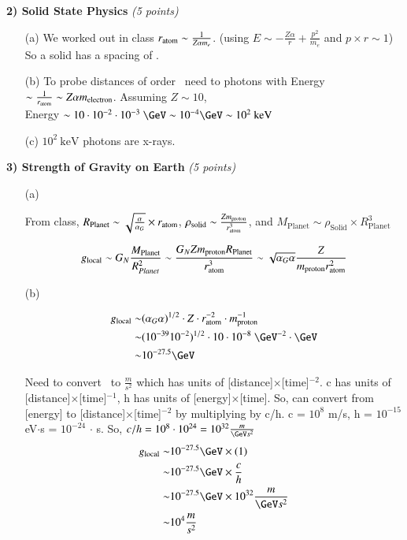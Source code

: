 {\large
\textbf{2) Solid State Physics} \hfill \textit{(5 points)}
\begin{itemize}
\item[(a)] {
We worked out in class $r_{\textrm{atom}} \sim \frac{1}{Z\alpha m_e}$. (using $E\sim - \frac{Z\alpha}{r} + \frac{p^2}{m_e}$ and $p\times r \sim 1$)
So a solid has a spacing of \rAtom.
}
\item[(b)] {
To probe distances of order \rAtom\ need to photons with Energy $\sim \frac{1}{r_{\textrm{atom}}} \sim Z \alpha m_{\textrm{electron}}$.
Assuming $Z\sim 10$, \\Energy $\sim 10 \cdot 10^{-2} \cdot 10^{-3}\ \GeV \sim 10^{-4} \GeV \sim 10^2\ \textrm{keV}$
}
\item[(c)] $10^2\ \textrm{keV}$ photons are x-rays.
\end{itemize}

\vspace*{0.25in}

\textbf{3) Strength of Gravity on Earth} \hfill \textit{(5 points)}
\begin{itemize}
\item[(a)]{
From class, $R_{\textrm{Planet}} \sim  \sqrt{\frac{\alpha}{\alpha_G}} \times r_{\textrm{atom}}$,   $\rho_{\textrm{solid}} \sim \frac{Zm_{\textrm{proton}}}{r_{\textrm{atom}}^3}$, and $M_{\textrm{Planet}} \sim \rho_{\textrm{Solid}} \times R_{\textrm{Planet}}^3$

\begin{equation*}
g_{\textrm{local}} \sim G_N \frac{M_{\textrm{Planet}}}{R_{Planet}^2} \sim \frac{G_N Z m_{\textrm{proton}} R_{\textrm{Planet}}}{r_{\textrm{atom}}^3}\sim \sqrt{\alpha_G \alpha} \frac{Z}{m_{\textrm{proton}} r_{\textrm{atom}}^2}
\end{equation*}
}
\item[(b)]{
\begin{align*}
g_{\textrm{local}}  \sim & (\alpha_G \alpha)^{1/2} \cdot Z \cdot \rAtom^{-2} \cdot \mp^{-1}\\
                    \sim & (10^{-39}10^{-2})^{1/2} \cdot 10 \cdot 10^{-8}\ \GeV^{-2} \cdot \GeV\\
                    \sim & 10^{-27.5} \GeV
\end{align*}

Need to convert \GeV\ to $\frac{m}{s^2}$ which has units of [distance]$\times$[time]$^{-2}$.
c has units of [distance]$\times$[time]$^{-1}$, h has units of [energy]$\times$[time].
So, can convert from [energy] to [distance]$\times$[time]$^{-2}$ by multiplying by c/h.
c = $10^8$ m/s, h = $10^{-15}$ eV$\cdot$s = $10^{-24}$ \GeV $\cdot$ s. 
So, $c/h = 10^8 \cdot 10^{24} = 10^{32} \frac{m}{\GeV s^2}$  
\begin{align*}
g_{\textrm{local}}  \sim & 10^{-27.5} \GeV  \times (1)\\
  \sim & 10^{-27.5} \GeV  \times \frac{c}{h} \\
  \sim & 10^{-27.5} \GeV  \times 10^{32}  \frac{m}{\GeV s^2} \\
  \sim & 10^{4} \frac{m}{s^2}
\end{align*}


}
\end{itemize}}
